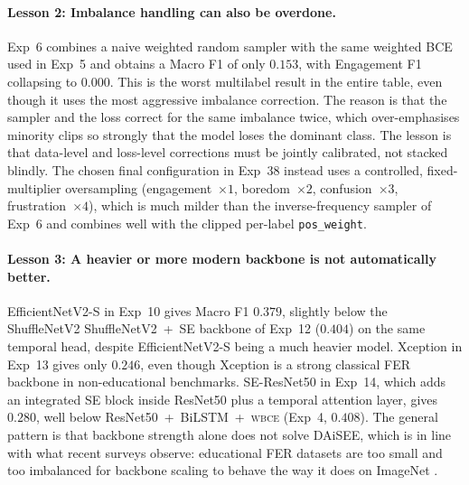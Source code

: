 \paragraph{Lesson 2: Imbalance handling can also be overdone.} Exp~6 combines a naive weighted random sampler with the same weighted BCE used in Exp~5 and obtains a Macro F1 of only $0.153$, with Engagement F1 collapsing to $0.000$. This is the worst multilabel result in the entire table, even though it uses the most aggressive imbalance correction. The reason is that the sampler and the loss correct for the same imbalance twice, which over-emphasises minority clips so strongly that the model loses the dominant class. The lesson is that data-level and loss-level corrections must be jointly calibrated, not stacked blindly. The chosen final configuration in Exp~38 instead uses a controlled, fixed-multiplier oversampling (engagement~$\times 1$, boredom~$\times 2$, confusion~$\times 3$, frustration~$\times 4$), which is much milder than the inverse-frequency sampler of Exp~6 and combines well with the clipped per-label \texttt{pos\_weight}.

\paragraph{Lesson 3: A heavier or more modern backbone is not automatically better.} EfficientNetV2-S in Exp~10 gives Macro F1 $0.379$, slightly below the ShuffleNetV2 ShuffleNetV2~+~SE backbone of Exp~12 ($0.404$) on the same temporal head, despite EfficientNetV2-S being a much heavier model. Xception in Exp~13 gives only $0.246$, even though Xception is a strong classical FER backbone in non-educational benchmarks. SE-ResNet50 in Exp~14, which adds an integrated SE block inside ResNet50 plus a temporal attention layer, gives $0.280$, well below ResNet50~+~BiLSTM~+~\textsc{wbce} (Exp~4, $0.408$). The general pattern is that backbone strength alone does not solve DAiSEE, which is in line with what recent surveys observe: educational FER datasets are too small and too imbalanced for backbone scaling to behave the way it does on ImageNet \cite{lek_academic_2023,vistorte_integrating_2024,florestiyanto_emotion_2024}.

